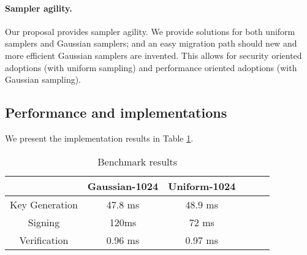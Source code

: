 \documentclass{llncs}
\newcommand{\<}{\langle}
\renewcommand{\>}{\rangle}
\begin{document}
\paragraph{Sampler agility.}
Our proposal provides sampler agility. We provide solutions for both
uniform samplers and Gaussian samplers; and an easy migration path
should new and more efficient Gaussian samplers are invented.
This allows for security oriented adoptions (with uniform sampling)
and performance oriented adoptions (with Gaussian sampling).

\subsection{Performance and implementations}
We present the implementation results in Table \ref{tab:bench}.

\begin{table}\centering\caption{Benchmark results}
\begin{tabular}{|c|c|c|c|c|c|}\hline
& \textsf{Gaussian-1024} &
\textsf{Uniform-1024} 
\\\hline\hline
Key Generation &  47.8 ms & 48.9 ms\\\hline
Signing & 120ms & 72 ms \\\hline%

Verification & 0.96 ms  & 0.97 ms\\\hline%


\end{tabular} \\\label{tab:bench}
\end{table}
\end{document}
